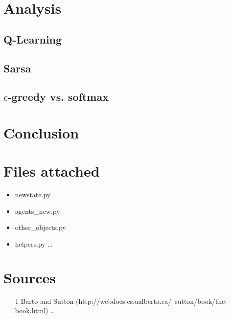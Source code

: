 \documentclass{article}
\begin{document}
\section*{Analysis}

\subsection*{Q-Learning}
\subsection*{Sarsa}
\subsection*{$\epsilon$-greedy vs. softmax}

\section*{Conclusion}

\section*{Files attached}
\begin{itemize}
\item newstate.py
\item agents\_new.py
\item other\_objects.py
\item helpers.py \ldots
\end{itemize}
\section*{Sources}

\begin{itemize}
	\item [1] Barto and Sutton (http://webdocs.cs.ualberta.ca/~sutton/book/the-book.html) \ldots
\end{itemize}
\end{document}
